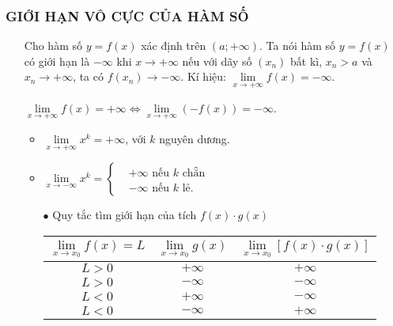 \subsubsection{GIỚI HẠN VÔ CỰC CỦA HÀM SỐ}
\begin{itemize}
	\item [\iconMT]  Cho hàm số $y=f(x)$ xác định trên $\left({a;+\infty}\right) $. Ta nói hàm số $y=f(x)$ có giới hạn là $-\infty $ khi $x\to +\infty $ nếu với dãy số $\left({x_n}\right)$ bất kì, $x_n>a$ và $x_n\to +\infty $, ta có $f\left({x_n}\right)\to -\infty $.	Kí hiệu: $\lim\limits_{x\to +\infty}f(x)=-\infty $.
	\item [\iconMT]    $\lim\limits_{x\to +\infty}f(x)=+\infty \Leftrightarrow \lim\limits_{x\to +\infty}\left({-f(x)}\right)=-\infty $.
	\item [\iconMT] 
	\begin{gachsoc}
		\begin{itemize}
			\item $\lim\limits_{x\to +\infty}x^k=+\infty $, với $k$ nguyên dương.
			\item $\lim\limits_{x\to -\infty}x^k=\left\{\begin{aligned}& +\infty \text{ nếu } k \text{ chẵn} \\
				& -\infty \text{ nếu } k \text{ lẻ}. 
			\end{aligned}\right. $
		\end{itemize}
	\end{gachsoc}
\item [\iconMT] 
\begin{itemize}
	\item [$\bullet$] Quy tắc tìm giới hạn của tích $f(x)\cdot g(x)$
	\begin{center}
		\begin{tabular}{|c|c|c|}
			\hline
			$\lim\limits_{x\to x_0}f(x)=L$ & $\lim\limits_{x\to x_0}g(x)$   & $\lim\limits_{x\to x_0}\left[{f(x)\cdot g(x)}\right]$ \\
			\hline
			$L>0$   & $+\infty $   & $+\infty $ \\
			\hline
			$L>0$    & $-\infty $    & $-\infty $ \\
			\hline
			$L<0$   & $+\infty $   & $-\infty $ \\
			\hline
			$L<0$    & $-\infty $    & $+\infty $ \\
			\hline
		\end{tabular}
	\end{center}

\end{itemize}
\end{itemize}
